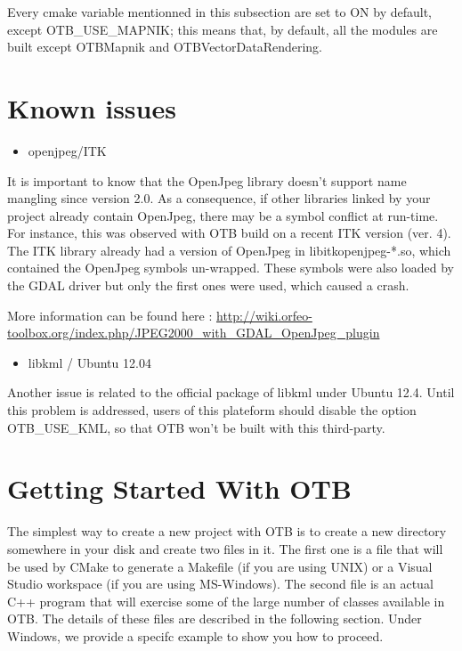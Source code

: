 Every cmake variable mentionned in this subsection are set to ON by default, except OTB\_USE\_MAPNIK; this means that, by default, all the modules are built except OTBMapnik and OTBVectorDataRendering.


\section{Known issues}
\label{sec:knownissues}

\begin{itemize}
\item  openjpeg/ITK 
\end{itemize}

It is important to know that the OpenJpeg library doesn't support name mangling since version 2.0. 
As a consequence, if other libraries linked by your project already contain OpenJpeg, there may be a symbol conflict at run-time. 
For instance, this was observed with OTB build on a recent ITK version (ver. 4). 
The ITK library already had a version of OpenJpeg in libitkopenjpeg-*.so, which contained the OpenJpeg symbols un-wrapped. 
These symbols were also loaded by the GDAL driver but only the first ones were used, which caused a crash. 

More information can be found here : \url{http://wiki.orfeo-toolbox.org/index.php/JPEG2000_with_GDAL_OpenJpeg_plugin}

\begin{itemize}
\item  libkml / Ubuntu 12.04 
\end{itemize}

Another issue is related to the official package of libkml under Ubuntu 12.4.
Until this problem is addressed, users of this plateform should disable the option OTB\_USE\_KML, so that OTB won't be built with this third-party.


\section{Getting Started With OTB }
\label{sec:GettingStartedWithOTB}

The simplest way to create a new project with OTB is to create a new directory somewhere in your disk and create two files in it. The first one is a  file that will be used by CMake to generate a Makefile (if you are using UNIX) or a Visual Studio workspace (if you are using MS-Windows).  The second file is an actual C++ program that will exercise some of the large number of classes available in OTB. The details of these files are described in the following section. Under Windows, we provide a specifc example to show you how to proceed.  

